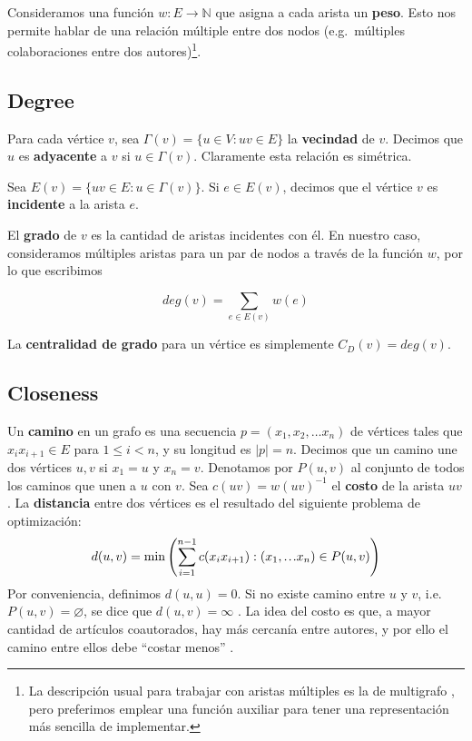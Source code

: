 \documentclass[journal]{IEEEtran}
\newcommand\mydots{\hbox to 1em{.\hss.\hss.}}
\begin{document}
Consideramos una función \(w: E \rightarrow \mathbb{N} \) que asigna a cada arista un \textbf{peso}. Esto nos permite hablar de una relación múltiple entre dos nodos (e.g.\ múltiples colaboraciones entre dos autores)\footnote{La descripción usual para trabajar con aristas múltiples es la de multigrafo \cite{diestel}, pero preferimos emplear una función auxiliar para tener una representación más sencilla de implementar. }. 

\subsection{Degree}

Para cada vértice \(v\), sea \(\Gamma(v) = \{u \in V : uv \in E \}\) la \textbf{vecindad} de \(v\). Decimos que \(u\) es \textbf{adyacente} a \(v\) si \(u \in \Gamma(v)\). Claramente esta relación es simétrica.

Sea \(E(v) = \{uv \in E : u \in \Gamma(v) \}\). Si \(e \in E(v)\), decimos que el vértice \(v\) es \textbf{incidente} a la arista \(e\).

El \textbf{grado} de \(v\) es la cantidad de aristas incidentes con él. En nuestro caso, consideramos múltiples aristas para un par de nodos a través de la función \(w\), por lo que escribimos \cite{bollobas}

\begin{equation}
	deg(v) = \sum_{e \in E(v)} w(e)
\end{equation}

La \textbf{centralidad de grado} para un vértice es simplemente \(C_D (v) = deg(v)\).

\subsection{Closeness}

Un \textbf{camino} en un grafo es una secuencia \(p = (x_1, x_2, \dots x_n)\) de vértices tales que \(x_{i}x_{i+1} \in E\) para \(1 \leq i < n\), y su longitud es \(|p| = n\). Decimos que un camino une dos vértices \(u, v\) si \(x_1 = u\) y \(x_n = v\). Denotamos por \(P(u, v)\) al conjunto de todos los caminos que unen a \(u\) con \(v\). Sea \(c(uv) = w(uv)^{-1}\) el \textbf{costo} de la arista \(uv\). La \textbf{distancia} entre dos vértices es el resultado del siguiente problema de optimización:
\begin{equation} \label{eq:distance}
d(u, v) = \min \left(\sum_{i=1}^{n-1} c(x_{i}x_{i+1}) : (x_1, \mydots x_n) \in P(u, v)\right)
\end{equation}
Por conveniencia, definimos \(d(u, u) = 0\). Si no existe camino entre \(u\) y \(v\), i.e. \(P(u, v) = \varnothing\), se dice que \(d(u, v) = \infty\) \cite{bollobas}. La idea del costo es que, a mayor cantidad de artículos coautorados, hay más cercanía entre autores, y por ello el camino entre ellos debe ``costar menos'' \cite{newman}.
\end{document}
